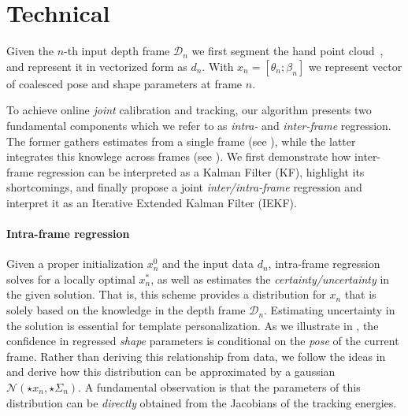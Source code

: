 \section{Technical}
Given the $n$-th input depth frame $\mathcal{D}_n$ we first segment the hand point cloud~\cite{htrack}, and represent it in vectorized form as $d_n$. With $x_n = [\theta_n; \beta_n]$ we represent vector of coalesced pose and shape parameters at frame $n$. 

To achieve online \emph{joint} calibration and tracking, our algorithm presents two fundamental components which we refer to as \emph{intra-} and \emph{inter-frame} regression. The former gathers estimates from a single frame (see ), while the latter integrates this knowlege across frames (see ). We first demonstrate how inter-frame regression can be interpreted as a Kalman Filter (KF), highlight its shortcomings, and finally propose a joint \emph{inter/intra-frame} regression and interpret it as an Iterative Extended Kalman Filter (IEKF).


\paragraph{Intra-frame regression}
Given a proper initialization $x_n^0$ and the input data $d_n$, intra-frame regression solves for a locally optimal $x_n^*$, as well as estimates the \emph{certainty/uncertainty} in the given solution. That is, this scheme provides a distribution for $x_n$ that is solely based on the knowledge in the depth frame $\mathcal{D}_n$. Estimating uncertainty in the solution is essential for template personalization. As we illustrate in , the confidence in regressed \emph{shape} parameters is conditional on the \emph{pose} of the current frame.
Rather than deriving this relationship from data, we follow the ideas in ~ and derive how this distribution can be approximated by a gaussian $\mathcal{N}(\star{x}_n, \star{\Sigma}_n)$. A fundamental observation is that the parameters of this distribution can be \emph{directly} obtained from the Jacobians of the tracking energies.


